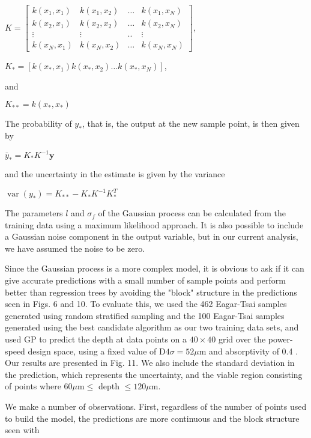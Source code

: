 \documentclass[10pt]{article}
\begin{document}
$K=\left[\begin{array}{cccc}k\left(x_{1}, x_{1}\right) & k\left(x_{1}, x_{2}\right) & \ldots & k\left(x_{1}, x_{N}\right) \\ k\left(x_{2}, x_{1}\right) & k\left(x_{2}, x_{2}\right) & \ldots & k\left(x_{2}, x_{N}\right) \\ \vdots & \vdots & . . & \vdots \\ k\left(x_{N}, x_{1}\right) & k\left(x_{N}, x_{2}\right) & \ldots & k\left(x_{N}, x_{N}\right)\end{array}\right]$,

$K_{*}=\left[k\left(x_{*}, x_{1}\right) k\left(x_{*}, x_{2}\right) \ldots k\left(x_{*}, x_{N}\right)\right]$,

and

$K_{* *}=k\left(x_{*}, x_{*}\right)$

The probability of $y_{*}$, that is, the output at the new sample point, is then given by

$\bar{y}_{*}=K_{*} K^{-1} \mathbf{y}$

and the uncertainty in the estimate is given by the variance

$\operatorname{var}\left(y_{*}\right)=K_{* *}-K_{*} K^{-1} K_{*}^{T}$

The parameters $l$ and $\sigma_{f}$ of the Gaussian process can be calculated from the training data using a maximum likelihood approach. It is also possible to include a Gaussian noise component in the output variable, but in our current analysis, we have assumed the noise to be zero.

Since the Gaussian process is a more complex model, it is obvious to ask if it can give accurate predictions with a small number of sample points and perform better than regression trees by avoiding the "block" structure in the predictions seen in Figs. 6 and 10. To evaluate this, we used the 462 Eagar-Tsai samples generated using random stratified sampling and the 100 Eagar-Tsai samples generated using the best candidate algorithm as our two training data sets, and used GP to predict the depth at data points on a $40 \times 40$ grid over the power-speed design space, using a fixed value of $\mathrm{D} 4 \sigma=52 \mu \mathrm{m}$ and absorptivity of 0.4 . Our results are presented in Fig. 11. We also include the standard deviation in the prediction, which represents the uncertainty, and the viable region consisting of points where $60 \mu \mathrm{m} \leq$ depth $\leq 120 \mu \mathrm{m}$.

We make a number of observations. First, regardless of the number of points used to build the model, the predictions are more continuous and the block structure seen with
\end{document}
